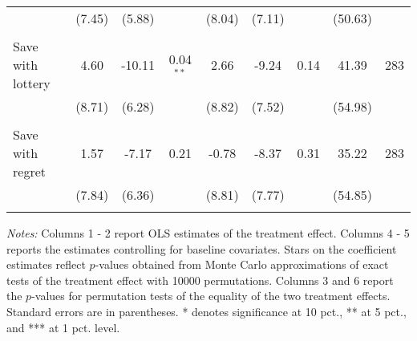 \begin{table}[htbp]
{\begin{threeparttable}
\begin{tabular}{l*{8}{c}}
          &   (7.45)&   (5.88)&         &   (8.04)&   (7.11)&         &  (50.63)&         \\
          &         &         &         &         &         &         &         &         \\
Save with lottery&     4.60&   -10.11&0.04$^{**}$&     2.66&    -9.24&     0.14&    41.39&      283\\
          &   (8.71)&   (6.28)&         &   (8.82)&   (7.52)&         &  (54.98)&         \\
          &         &         &         &         &         &         &         &         \\
Save with regret&     1.57&    -7.17&     0.21&    -0.78&    -8.37&     0.31&    35.22&      283\\
          &   (7.84)&   (6.36)&         &   (8.81)&   (7.77)&         &  (54.85)&         \\
          &         &         &         &         &         &         &         &         \\
\bottomrule \end{tabular} \begin{tablenotes}[flushleft] \footnotesize \item \emph{Notes:} Columns 1 - 2 report OLS estimates of the treatment effect. Columns 4 - 5 reports the estimates controlling for baseline covariates. Stars on the coefficient estimates reflect \(p\)-values obtained from Monte Carlo approximations of exact tests of the treatment effect with 10000 permutations. Columns 3 and 6 report the \(p\)-values for permutation tests of the equality of the two treatment effects. Standard errors are in parentheses. * denotes significance at 10 pct., ** at 5 pct., and *** at 1 pct. level. \end{tablenotes} \end{threeparttable} } \end{table}

